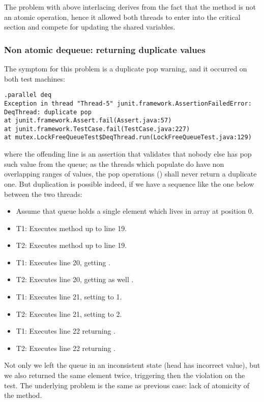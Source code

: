 The problem with above interlacing derives from the fact that the
 method is not an atomic operation, hence it allowed both threads to
enter into the critical section and compete for updating the shared
variables. 

\subsubsection{Non atomic dequeue: returning duplicate values}

The symptom for this problem is a duplicate pop warning, and it
occurred on both test machines:

\begin{verbatim}
.parallel deq
Exception in thread "Thread-5" junit.framework.AssertionFailedError: DeqThread: duplicate pop
at junit.framework.Assert.fail(Assert.java:57)
at junit.framework.TestCase.fail(TestCase.java:227)
at mutex.LockFreeQueueTest$DeqThread.run(LockFreeQueueTest.java:129)
\end{verbatim}
\hfill

where the offending line is an assertion that validates that nobody
else has pop such value from the queue; as the threads which populate
do have non overlapping ranges of values, the pop operations ()
shall never return a duplicate one. But duplication is possible
indeed, if we have a sequence like the one below between the two threads:

\begin{itemize}
\item Assume that queue holds a single element which lives in 
  array at position 0.
\item T1: Executes method up to line 19. 
\item T2: Executes method up to line 19. 
\item T1: Executes line 20, getting .
\item T2: Executes line 20, getting as well .
\item T1: Executes line 21, setting  to 1.
\item T2: Executes line 21, setting  to 2.
\item T1: Executes line 22 returning .
\item T2: Executes line 22 returning .
\end{itemize}
\hfill

Not only we left the queue in an inconsistent state (head has
incorrect value), but we also returned the same element twice,
triggering then the violation on the test. The underlying problem is
the same as previous case: lack of atomicity of the  method.

